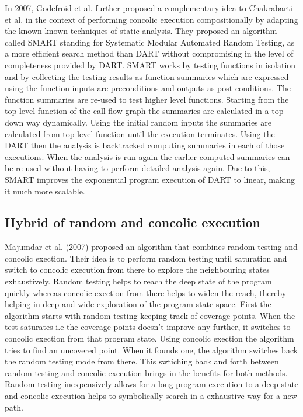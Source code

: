 \documentclass[	runningheads,
				a4paper]{llncs}
\begin{document}
In 2007, Godefroid et al. \cite{godefroid2007compositional} further proposed a complementary idea \cite{godefroid2007compositional} to Chakrabarti et al. \cite{chakrabarti2006software} in the context of performing concolic execution compositionally by adapting the known known techniques of static analysis. 
They proposed an algorithm called SMART standing for Systematic Modular Automated Random Testing, as a more efficient search method than DART \cite{godefroid2005dart} without compromising in the level of completeness provided by DART. SMART works by testing functions in isolation and by collecting the testing results as function summaries which are expressed using the function inputs are preconditions and outputs as post-conditions. The function summaries are re-used to test higher level functions. Starting from the top-level function of the call-flow graph the summaries are calculated in a top-down way dynamically. Using the initial random inputs the summaries are calculated from top-level function until the execution terminates. Using the DART then the analysis is backtracked computing summaries in each of those executions. When the analysis is run again the earlier computed summaries can be re-used without having to perform detailed analysis again. Due to this, SMART improves the exponential program execution of DART to linear, making it much more scalable.


\subsection{Hybrid of random and concolic execution}
Majumdar et al. (2007) \cite{majumdar2007hybrid} proposed an algorithm that combines random testing and concolic exection. Their idea is to perform random testing until saturation and switch to concolic execution from there to explore the neighbouring states exhaustively. Random testing helps to reach the deep state of the program quickly whereas concolic exection from there helps to widen the reach, thereby helping in deep and wide exploration of the program state space. First the algorithm starts with random testing keeping track of coverage points. When the test saturates i.e the coverage points doesn't improve any further, it switches to concolic exection from that program state. Using concolic exection the algorithm tries to find an uncovered point. When it founds one, the algorithm switches back the random testing mode from there. This swtiching back and forth between random testing and concolic execution brings in the benefits for both methods. Random testing inexpensively allows for a long program execution to a deep state and concolic execution helps to symbolically search in a exhaustive way for a new path.
\end{document}
